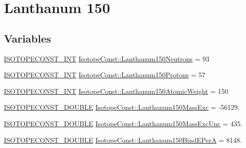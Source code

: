 \hypertarget{group___isotope_const-_lanthanum-_la150}{}\section{Lanthanum 150}
\label{group___isotope_const-_lanthanum-_la150}
\subsection*{Variables}
\begin{DoxyCompactItemize}
\item 
\mbox{\hyperlink{group___isotope_const-_macros_ga5f18360b3e99483a35c32d789e62621c}{I\+S\+O\+T\+O\+P\+E\+C\+O\+N\+S\+T\+\_\+\+I\+NT}} \mbox{\hyperlink{group___isotope_const-_lanthanum-_la150_ga99d5a08bd36117218829269acc61c592}{Isotope\+Const\+::\+Lanthanum150\+Neutrons}} = 93
\item 
\mbox{\hyperlink{group___isotope_const-_macros_ga5f18360b3e99483a35c32d789e62621c}{I\+S\+O\+T\+O\+P\+E\+C\+O\+N\+S\+T\+\_\+\+I\+NT}} \mbox{\hyperlink{group___isotope_const-_lanthanum-_la150_ga2bf687c46efeb6a16903fed73401afff}{Isotope\+Const\+::\+Lanthanum150\+Protons}} = 57
\item 
\mbox{\hyperlink{group___isotope_const-_macros_ga5f18360b3e99483a35c32d789e62621c}{I\+S\+O\+T\+O\+P\+E\+C\+O\+N\+S\+T\+\_\+\+I\+NT}} \mbox{\hyperlink{group___isotope_const-_lanthanum-_la150_ga33cf52e8632588bef35d27e12f0f4b7c}{Isotope\+Const\+::\+Lanthanum150\+Atomic\+Weight}} = 150
\item 
\mbox{\hyperlink{group___isotope_const-_macros_ga8f45a7272ce02c0b4c65c44636ed719a}{I\+S\+O\+T\+O\+P\+E\+C\+O\+N\+S\+T\+\_\+\+D\+O\+U\+B\+LE}} \mbox{\hyperlink{group___isotope_const-_lanthanum-_la150_ga23e1f0e95adf49b75eb8c8af9a91f25a}{Isotope\+Const\+::\+Lanthanum150\+Mass\+Exc}} = -\/56129.
\item 
\mbox{\hyperlink{group___isotope_const-_macros_ga8f45a7272ce02c0b4c65c44636ed719a}{I\+S\+O\+T\+O\+P\+E\+C\+O\+N\+S\+T\+\_\+\+D\+O\+U\+B\+LE}} \mbox{\hyperlink{group___isotope_const-_lanthanum-_la150_ga143f279293d9c74cb0bef1e03c3e51b2}{Isotope\+Const\+::\+Lanthanum150\+Mass\+Exc\+Unc}} = 435.
\item 
\mbox{\hyperlink{group___isotope_const-_macros_ga8f45a7272ce02c0b4c65c44636ed719a}{I\+S\+O\+T\+O\+P\+E\+C\+O\+N\+S\+T\+\_\+\+D\+O\+U\+B\+LE}} \mbox{\hyperlink{group___isotope_const-_lanthanum-_la150_ga5162d38018d51ed3d2e2ad57b35262cc}{Isotope\+Const\+::\+Lanthanum150\+Bind\+E\+PerA}} = 8148.
\item 

\end{DoxyCompactItemize}
